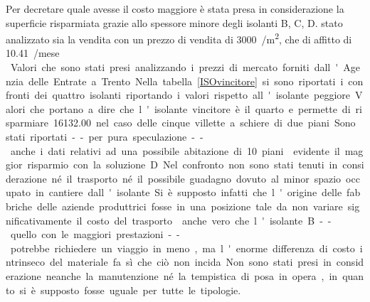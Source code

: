 Per decretare quale avesse il costo maggiore è stata presa in considerazione la superficie risparmiata grazie allo spessore minore degli isolanti B, C, D.
\e stato analizzato sia la vendita con un  prezzo di vendita di \SI{3000}{\teuro / \square\metre}, che di affitto di \SI{10.41}{\teuro /\square\metre mese }. Valori che sono stati presi analizzando i prezzi di mercato forniti dall'Agenzia delle Entrate a Trento.


Nella tabella \ref{ISOvincitore} si sono riportati i confronti dei quattro isolanti riportando i valori rispetto all'isolante peggiore.
Valori che portano a dire che l'isolante vincitore è il quarto e permette di risparmiare \SI{16132.00}{\teuro} nel caso delle cinque villette a schiere di due piani.
Sono stati riportati -- per pura speculazione -- anche i dati relativi ad una possibile abitazione di 10 piani.
\e evidente il maggior risparmio con la soluzione D.

Nel confronto non sono stati tenuti in considerazione né il trasporto né il possibile guadagno dovuto al minor spazio occupato in cantiere dall'isolante.
Si è supposto infatti che l'origine delle fabbriche delle aziende produttrici fosse in una posizione tale da non variare significativamente il costo del trasporto. 
\e anche vero che l'isolante B -- quello con le maggiori prestazioni -- potrebbe richiedere un viaggio in meno, ma l'enorme differenza di costo intrinseco del materiale fa sì che ciò non incida.

Non sono stati presi in considerazione neanche la manutenzione né la tempistica di posa in opera, in quanto si è supposto fosse uguale per tutte le tipologie.
